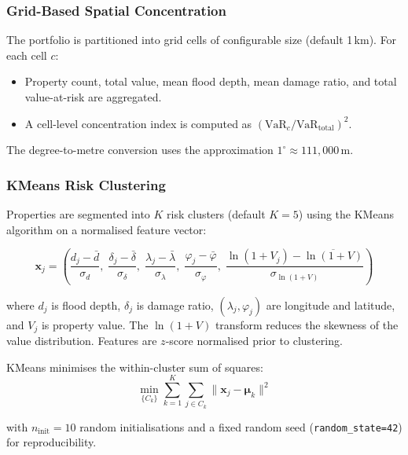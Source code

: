 \documentclass[11pt,a4paper]{article}
\begin{document}
\subsubsection{Grid-Based Spatial Concentration}

The portfolio is partitioned into grid cells of configurable size (default 1\,km). For
each cell $c$:
\begin{itemize}[nosep]
    \item Property count, total value, mean flood depth, mean damage ratio, and total
          value-at-risk are aggregated.
    \item A cell-level concentration index is computed as $(\text{VaR}_c / \text{VaR}_{\text{total}})^2$.
\end{itemize}

\noindent The degree-to-metre conversion uses the approximation
$1^{\circ} \approx 111{,}000\,$m.

\subsubsection{KMeans Risk Clustering}

Properties are segmented into $K$ risk clusters (default $K = 5$) using the KMeans
algorithm on a normalised feature vector:

\begin{equation}
    \mathbf{x}_j = \left(\frac{d_j - \bar{d}}{\sigma_d}, \;
    \frac{\delta_j - \bar{\delta}}{\sigma_\delta}, \;
    \frac{\lambda_j - \bar{\lambda}}{\sigma_\lambda}, \;
    \frac{\varphi_j - \bar{\varphi}}{\sigma_\varphi}, \;
    \frac{\ln(1 + V_j) - \overline{\ln(1+V)}}{\sigma_{\ln(1+V)}}\right)
    \label{eq:features}
\end{equation}

\noindent where $d_j$ is flood depth, $\delta_j$ is damage ratio, $(\lambda_j, \varphi_j)$
are longitude and latitude, and $V_j$ is property value. The $\ln(1 + V)$ transform
reduces the skewness of the value distribution. Features are $z$-score normalised prior
to clustering.

KMeans minimises the within-cluster sum of squares:
\begin{equation}
    \min_{\{C_k\}} \sum_{k=1}^{K} \sum_{j \in C_k}
    \|\mathbf{x}_j - \boldsymbol{\mu}_k\|^2
    \label{eq:kmeans}
\end{equation}

\noindent with $n_{\text{init}} = 10$ random initialisations and a fixed random seed
(\texttt{random\_state=42}) for reproducibility.
\end{document}
